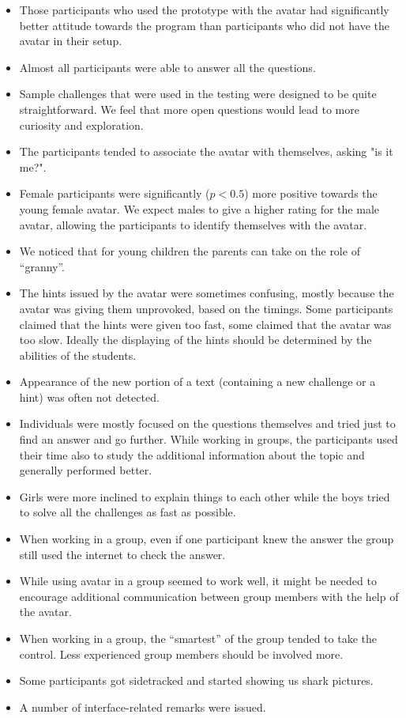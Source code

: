 \documentclass[a4paper]{article}
\begin{document}
\begin{itemize}
	\item Those participants who used the prototype with the avatar had significantly better attitude towards the program than participants who did not have the avatar in their setup.
	\item Almost all participants were able to answer all the questions. 
	\item Sample challenges that were used in the testing were designed to be quite straightforward. We feel that more open questions would lead to more curiosity and exploration. 
	\item The participants tended to associate the avatar with themselves, asking "is it me?".
	\item Female participants were significantly ($p < 0.5$) more positive towards the young female avatar. We expect males to give a higher rating for the male avatar, allowing the participants to identify themselves with the avatar.
	\item We noticed that for young children the parents can take on the role of “granny”.
	\item The hints issued by the avatar were sometimes confusing, mostly because the avatar was giving them unprovoked, based on the timings. Some participants claimed that the hints were given too fast, some claimed that the avatar was too slow. Ideally the displaying of the hints should be determined by the abilities of the students.
	\item Appearance of the new portion of a text (containing a new challenge or a hint) was often not detected.
	\item Individuals were mostly focused on the questions themselves and tried just to find an answer and go further. While working in groups, the participants used their time also to study the additional information about the topic and generally performed better.
	\item Girls were more inclined to explain things to each other while the boys tried to solve all the challenges as fast as possible.
	\item When working in a group, even if one participant knew the answer the group still used the internet to check the answer.
	\item While using avatar in a group seemed to work well, it might be needed to encourage additional communication between group members with the help of the avatar.
	\item When working in a group, the “smartest” of the group tended to take the control. Less experienced group members should be involved more.
	\item Some participants got sidetracked and started showing us shark pictures.
	\item A number of interface-related remarks were issued. 
\end{itemize}
\end{document}
